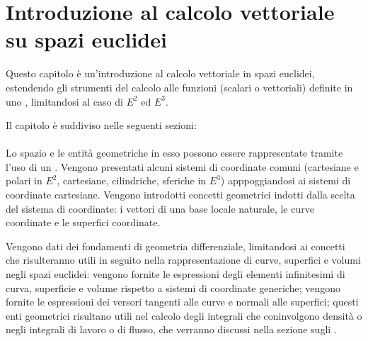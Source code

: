 \documentclass[letterpaper,10pt,italian]{jupyterBook}
\begin{document}
\sphinxstepscope


\chapter{Introduzione al calcolo vettoriale su spazi euclidei}
\label{\detokenize{ch/vector-calculus:introduzione-al-calcolo-vettoriale-su-spazi-euclidei}}\label{\detokenize{ch/vector-calculus:vector-calculus}}\label{\detokenize{ch/vector-calculus::doc}}
\sphinxAtStartPar
Questo capitolo è un’introduzione al calcolo vettoriale in spazi euclidei, estendendo gli strumenti del calcolo alle funzioni (scalari o vettoriali) definite in uno {\hyperref[\detokenize{ch/analytic_geometry/euclidean_space:geometry-analytic-euclidean-space}]{}}, limitandosi al caso di \(E^2\) ed \(E^3\).

\sphinxAtStartPar
Il capitolo è suddiviso nelle seguenti sezioni:
\subsubsection*{}

\sphinxAtStartPar
Lo spazio e le entità geometriche in esso possono essere rappresentate tramite l’uso di un . Vengono presentati alcuni sistemi di coordinate comuni (cartesiane e polari in \(E^2\), cartesiane, cilindriche, sferiche in \(E^3\)) apppoggiandosi ai sistemi di coordinate cartesiane. Vengono introdotti concetti geometrici indotti dalla scelta del sistema di coordinate: i vettori di una base locale naturale, le curve coordinate e le superfici coordinate.

\sphinxAtStartPar
Vengono dati dei fondamenti di geometria differenziale, limitandosi ai concetti che risulteranno utili in seguito nella rappresentazione di curve, superfici e volumi negli spazi euclidei: vengono fornite le espressioni degli elementi infinitesimi di curva, superficie e volume rispetto a sistemi di coordinate generiche; vengono fornite le espressioni dei versori tangenti alle curve e normali alle superfici; questi enti geometrici risultano utili nel calcolo degli integrali che coninvolgono densità o negli integrali di lavoro o di flusso, che verranno discussi nella sezione sugli {\hyperref[\detokenize{ch/vector-calculus/integrals:vector-calculus-integrals}]{}}.
\end{document}
